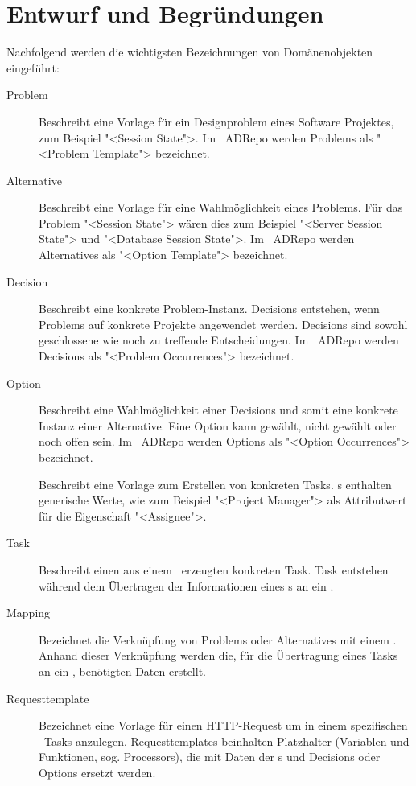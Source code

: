 	\section{Entwurf und Begründungen}
		Nachfolgend werden die wichtigsten Bezeichnungen von Domänenobjekten eingeführt:
		
		\begin{description}
			\item[Problem] Beschreibt eine Vorlage für ein Designproblem eines Software Projektes, 
				zum Beispiel "<Session State">. 
				Im \dks\ ADRepo werden Problems als "<Problem Template"> bezeichnet.
			\item[Alternative] Beschreibt eine Vorlage für eine Wahlmöglichkeit eines Problems.
				Für das Problem "<Session State"> wären dies zum Beispiel "<Server Session State"> und
				"<Database Session State">. 
				Im \dks\ ADRepo werden Alternatives als "<Option Template"> bezeichnet.
			\item[Decision] Beschreibt eine konkrete Problem-Instanz.
				Decisions entstehen, wenn Problems auf konkrete Projekte angewendet werden.
				Decisions sind sowohl geschlossene wie noch zu treffende Entscheidungen.
				Im \dks\ ADRepo werden Decisions als "<Problem Occurrences"> bezeichnet.
			\item[Option] Beschreibt eine Wahlmöglichkeit einer Decisions 
				und somit eine konkrete Instanz einer Alternative.
				Eine Option kann gewählt, nicht gewählt oder noch offen sein.
				Im \dks\ ADRepo werden Options als "<Option Occurrences"> bezeichnet.
			\item[\ttpl] Beschreibt eine Vorlage zum Erstellen von konkreten Tasks.
				\ttpl s enthalten generische Werte, wie zum Beispiel "<Project Manager"> als
				Attributwert für die Eigenschaft "<Assignee">.
			\item[Task] Beschreibt einen aus einem \ttpl\ erzeugten konkreten Task.
				Task entstehen während dem Übertragen der Informationen eines \ttpl s an ein \ppt.
			\item[Mapping] Bezeichnet die Verknüpfung von Problems oder Alternatives mit einem \ttpl. 
				Anhand dieser Verknüpfung werden die, für die Übertragung eines Tasks an ein \ppt, benötigten Daten erstellt.
			\item[Requesttemplate] Bezeichnet eine Vorlage für einen HTTP-Request um 
				in einem spezifischen \ppt\ Tasks anzulegen.
				Requesttemplates beinhalten Platzhalter (Variablen und Funktionen, sog. Processors),
				die mit Daten der \ttpl s und Decisions oder Options ersetzt werden. 
		\end{description}	
	
